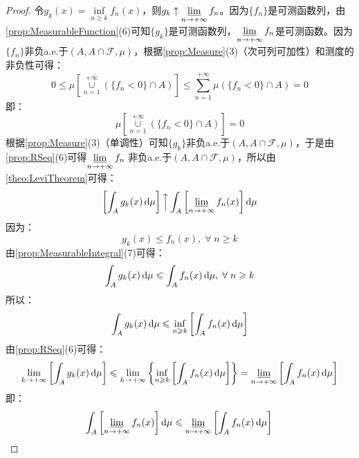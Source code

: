 \begin{proof}
	令$g_k(x)=\inf\limits_{n\geqslant k}f_n(x)$，则$g_k\uparrow\varliminf\limits_{n\to+\infty}f_n$。因为$\{f_n\}$是可测函数列，由\cref{prop:MeasurableFunction}(6)可知$\{g_k\}$是可测函数列，$\varliminf\limits_{n\to+\infty}f_n$是可测函数。因为$\{f_n\}$非负a.e.于$(A,A\cap\mathscr{F},\mu)$，根据\cref{prop:Measure}(3)（次可列可加性）和测度的非负性可得：
	\begin{equation*}
		0\leqslant\mu\left[\underset{n=1}{\overset{+\infty}{\cup}}(\{f_n<0\}\cap A)\right]\leqslant\sum_{n=1}^{+\infty}\mu(\{f_n<0\}\cap A)=0
	\end{equation*}
	即：
	\begin{equation*}
		\mu\left[\underset{n=1}{\overset{+\infty}{\cup}}(\{f_n<0\}\cap A)\right]=0
	\end{equation*}
	根据\cref{prop:Measure}(3)（单调性）可知$\{g_k\}$非负a.e.于$(A,A\cap\mathscr{F},\mu)$，于是由\cref{prop:RSeq}(6)可得$\varliminf\limits_{n\to+\infty}f_n\;$非负a.e.于$(A,A\cap\mathscr{F},\mu)$，所以由\cref{theo:LeviTheorem}可得：
	\begin{align*}
		\left[\int_{A}g_k(x)\mathop{}\!\mathrm{d}\mu\right]\Big\uparrow\int_{A}\left[\varliminf_{n\to+\infty}f_n(x)\right]\mathop{}\!\mathrm{d}\mu
	\end{align*}
	因为：
	\begin{equation*}
		g_k(x)\leqslant f_n(x),\;\forall\;n\geqslant k
	\end{equation*}
	由\cref{prop:MeasurableIntegral}(7)可得：
	\begin{equation*}
		\int_{A}g_k(x)\mathop{}\!\mathrm{d}\mu\leqslant\int_{A}f_n(x)\mathop{}\!\mathrm{d}\mu,\;\forall\;n\geqslant k
	\end{equation*}
	所以：
	\begin{equation*}
		\int_{A}g_k(x)\mathop{}\!\mathrm{d}\mu\leqslant\inf_{n\geqslant k}\left[\int_{A}f_n(x)\mathop{}\!\mathrm{d}\mu\right]
	\end{equation*}
	由\cref{prop:RSeq}(6)可得：
	\begin{equation*}
		\lim_{k\to+\infty}\left[\int_{A}g_k(x)\mathop{}\!\mathrm{d}\mu\right]\leqslant\lim_{k\to+\infty}\left\{\inf_{n\geqslant k}\left[\int_{A}f_n(x)\mathop{}\!\mathrm{d}\mu\right]\right\}=\varliminf_{n\to+\infty}\left[\int_{A}f_n(x)\mathop{}\!\mathrm{d}\mu\right]
	\end{equation*}
	即：
	\begin{equation*}
		\int_{A}\left[\varliminf_{n\to+\infty}f_n(x)\right]\mathop{}\!\mathrm{d}\mu\leqslant\varliminf_{n\to+\infty}\left[\int_{A}f_n(x)\mathop{}\!\mathrm{d}\mu\right]\qedhere
	\end{equation*}
\end{proof}
